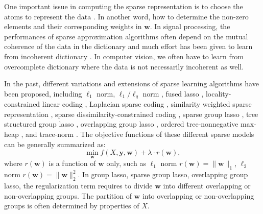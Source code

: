 \documentclass[journal]{IEEEtran}
\begin{document}
      One important issue in computing the sparse representation is to choose the atoms   to represent the data \cite{Wright10}. In another word, how to determine the non-zero elements and their corresponding weights in $\textbf{w}$. In signal processing,  the performances of sparse approximation algorithms often depend  on the mutual coherence of the data in the dictionary and much effort has been given to learn from incoherent dictionary  \cite{6451295}.
    In computer vision, we often have to learn from overcomplete   dictionary  where the data is  not necessarily incoherent as well. %

  In the past, different variations and extensions of sparse learning  algorithms have been proposed, including $\ell_1$ norm, $\ell_1/\ell_q$ norm \cite{Argyriou2008},   fused lasso \cite{Tibshirani2005}, locality-constrained linear coding \cite{llc2010}, Laplacian sparse coding \cite{gao2010}, similarity weighted sparse representation \cite{guo2012}, sparse dissimilarity-constrained coding \cite{CJ15}, sparse group lasso \cite{sparsegrouplasso2010}, tree structured group lasso \cite{Jacob2009}, overlapping group lasso \cite{vijver2002}, ordered tree-nonnegative max-heap \cite{Zhao_thecomposite}, and trace-norm \cite{945730}.
  The objective functions of these different sparse models can be  generally summarized as:
  \begin{equation}
     \min_\textbf{w} f(X, \textbf{y}, \textbf{w})+ \lambda \cdot r(\textbf{w}),  \label{eq4}
  \end{equation}
     where  $r(\textbf{w})$ is a function of $\textbf{w}$ only, such as $\ell_1$ norm $r(\textbf{w})=\|\textbf{w}\|_1$, $\ell_2$ norm $r(\textbf{w})=\|\textbf{w}\|_2^2$. In group lasso,  sparse group lasso, overlapping group lasso, the regularization term requires to divide $\textbf{w}$ into different overlapping or non-overlapping groups. The partition of   $\textbf{w}$ into overlapping or non-overlapping groups is often determined by properties of $X$.
\end{document}
